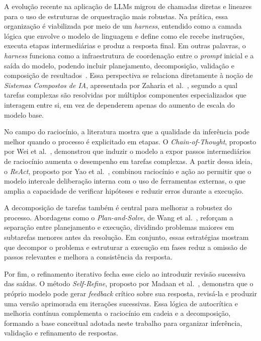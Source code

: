 \documentclass[a4paper,10pt,twocolumn]{article}
\begin{document}
A evolução recente na aplicação de LLMs migrou de chamadas diretas e lineares para o uso de estruturas de orquestração mais robustas. Na prática, essa organização é viabilizada por meio de um \textit{harness}, entendido como a camada lógica que envolve o modelo de linguagem e define como ele recebe instruções, executa etapas intermediárias e produz a resposta final. Em outras palavras, o \textit{harness} funciona como a infraestrutura de coordenação entre o \textit{prompt} inicial e a saída do modelo, podendo incluir planejamento, decomposição, validação e composição de resultados~\cite{zaharia2024compound}. Essa perspectiva se relaciona diretamente à noção de \textit{Sistemas Compostos de IA}, apresentada por Zaharia et al.~\cite{zaharia2024compound}, segundo a qual tarefas complexas são resolvidas por múltiplos componentes especializados que interagem entre si, em vez de dependerem apenas do aumento de escala do modelo base.

No campo do raciocínio, a literatura mostra que a qualidade da inferência pode melhor quando o processo é explicitado em etapas. O \textit{Chain-of-Thought}, proposto por Wei et al.~\cite{wei2022chain}, demonstrou que induzir o modelo a expor passos intermediários de raciocínio aumenta o desempenho em tarefas complexas. A partir dessa ideia, o \textit{ReAct}, proposto por Yao et al.~\cite{yao2022react}, combinou raciocínio e ação ao permitir que o modelo intercale deliberação interna com o uso de ferramentas externas, o que amplia a capacidade de verificar hipóteses e reduzir erros durante a execução.

A decomposição de tarefas também é central para melhorar a robustez do processo. Abordagens como o \textit{Plan-and-Solve}, de Wang et al.~\cite{wang2023plan}, reforçam a separação entre planejamento e execução, dividindo problemas maiores em subtarefas menores antes da resolução. Em conjunto, essas estratégias mostram que decompor o problema e estruturar a execução em fases reduz a omissão de passos relevantes e melhora a consistência da resposta.

Por fim, o refinamento iterativo fecha esse ciclo ao introduzir revisão sucessiva das saídas. O método \textit{Self-Refine}, proposto por Madaan et al.~\cite{madaan2023selfrefine}, demonstra que o próprio modelo pode gerar \textit{feedback} crítico sobre sua resposta, revisá-la e produzir uma versão aprimorada em iterações sucessivas. Essa lógica de autocrítica e melhoria contínua complementa o raciocínio em cadeia e a decomposição, formando a base conceitual adotada neste trabalho para organizar inferência, validação e refinamento de respostas.
\end{document}
